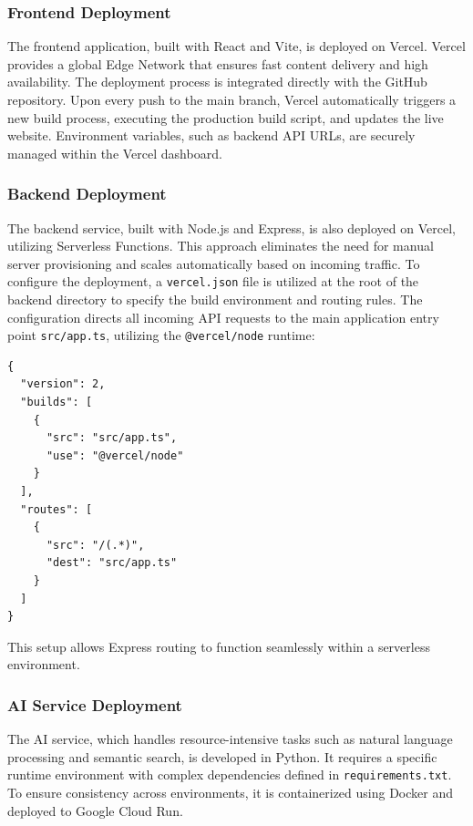 \subsubsection{Frontend Deployment}
The frontend application, built with React and Vite, is deployed on Vercel. Vercel provides a global Edge Network that ensures fast content delivery and high availability. The deployment process is integrated directly with the GitHub repository. Upon every push to the main branch, Vercel automatically triggers a new build process, executing the production build script, and updates the live website. Environment variables, such as backend API URLs, are securely managed within the Vercel dashboard.

\subsubsection{Backend Deployment}
The backend service, built with Node.js and Express, is also deployed on Vercel, utilizing Serverless Functions. This approach eliminates the need for manual server provisioning and scales automatically based on incoming traffic.
To configure the deployment, a \texttt{vercel.json} file is utilized at the root of the backend directory to specify the build environment and routing rules. The configuration directs all incoming API requests to the main application entry point \texttt{src/app.ts}, utilizing the \texttt{@vercel/node} runtime:

\begin{verbatim}
{
  "version": 2,
  "builds": [
    {
      "src": "src/app.ts",
      "use": "@vercel/node"
    }
  ],
  "routes": [
    {
      "src": "/(.*)",
      "dest": "src/app.ts"
    }
  ]
}
\end{verbatim}
This setup allows Express routing to function seamlessly within a serverless environment.

\subsubsection{AI Service Deployment}
The AI service, which handles resource-intensive tasks such as natural language processing and semantic search, is developed in Python. It requires a specific runtime environment with complex dependencies defined in \texttt{requirements.txt}. To ensure consistency across environments, it is containerized using Docker and deployed to Google Cloud Run.

